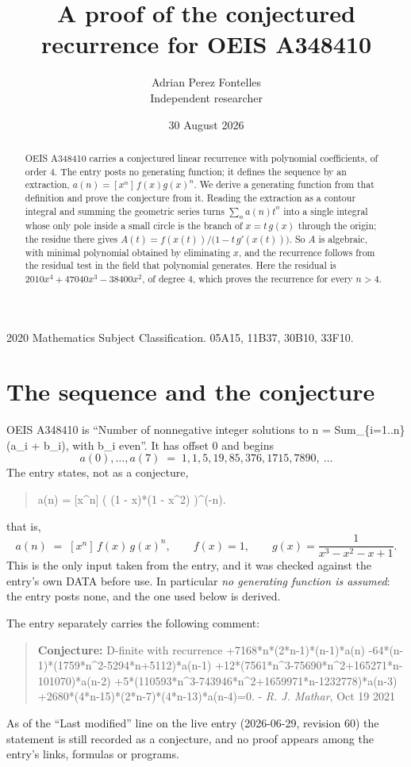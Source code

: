 \documentclass[11pt,a4paper]{article}
\title{A proof of the conjectured recurrence for OEIS A348410}
\author{Adrian Perez Fontelles\\ \small Independent researcher}
\date{30 August 2026}
\theoremstyle{plain}
\theoremstyle{definition}
\begin{document}
\maketitle

\begin{abstract}
OEIS A348410 carries a conjectured linear recurrence with polynomial coefficients, of
order 4. The entry posts no generating function; it defines the sequence by an
extraction, $a(n)=[x^{n}]\,f(x)g(x)^{n}$. We derive a generating function from that
definition and prove the conjecture from it. Reading the extraction as a contour integral
and summing the geometric series turns $\sum_{n}a(n)t^{n}$ into a single integral whose
only pole inside a small circle is the branch of $x=t\,g(x)$ through the origin; the
residue there gives $A(t)=f(x(t))/\bigl(1-t\,g'(x(t))\bigr)$. So $A$ is algebraic, with
minimal polynomial obtained by eliminating $x$, and the recurrence follows from the
residual test in the field that polynomial generates. Here the residual is
$2010 x^{4} + 47040 x^{3} - 38400 x^{2}$, of degree $4$, which proves the recurrence for every $n>4$.
\end{abstract}

\noindent\small 2020 Mathematics Subject Classification. 05A15, 11B37, 30B10, 33F10.\normalsize

\section{The sequence and the conjecture}

OEIS A348410 is ``Number of nonnegative integer solutions to n = Sum\_\{i=1..n\} (a\_i + b\_i), with b\_i even''. It has offset $0$ and begins
\[
a(0),\dots,a(7)\;=\;1, 1, 5, 19, 85, 376, 1715, 7890,\ \dots
\]
The entry states, not as a conjecture,
\begin{quote}\small
a(n) = [x\textasciicircum{}n] ( (1 - x)*(1 - x\textasciicircum{}2) )\textasciicircum{}(-n).
\end{quote}
that is,
\begin{equation}\label{eq:def}
a(n)\;=\;[x^{n}]\,f(x)\,g(x)^{n},
\qquad f(x)=1,\qquad g(x)=\frac{1}{x^{3} - x^{2} - x + 1} .
\end{equation}
This is the only input taken from the entry, and it was checked against the entry's own
DATA before use. In particular \emph{no generating function is assumed}: the entry posts
none, and the one used below is derived.

The entry separately carries the following comment:
\begin{quote}\small
\textbf{Conjecture:} D-finite with recurrence +7168*n*(2*n-1)*(n-1)*a(n) -64*(n-1)*(1759*n\textasciicircum{}2-5294*n+5112)*a(n-1) +12*(7561*n\textasciicircum{}3-75690*n\textasciicircum{}2+165271*n-101070)*a(n-2) +5*(110593*n\textasciicircum{}3-743946*n\textasciicircum{}2+1659971*n-1232778)*a(n-3) +2680*(4*n-15)*(2*n-7)*(4*n-13)*a(n-4)=0. - \emph{R. J. Mathar}, Oct 19 2021
\end{quote}
As of the ``Last modified'' line on the live entry (2026-06-29, revision 60) the
statement is still recorded as a conjecture, and no proof appears among the entry's links,
formulas or programs.
\end{document}
